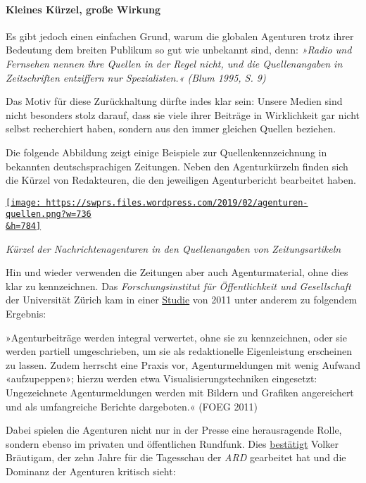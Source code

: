 \hypertarget{kleines-kuxfcrzel-grouxdfe-wirkung}{%
\paragraph{Kleines Kürzel, große
Wirkung}\label{kleines-kuxfcrzel-grouxdfe-wirkung}}

Es gibt jedoch einen einfachen Grund, warum die globalen Agenturen trotz
ihrer Bedeutung dem brei­ten Publikum so gut wie unbekannt sind, denn:
\emph{»Radio und Fernsehen nennen ihre Quellen in der Regel nicht, und
die Quellenangaben in Zeitschriften entziffern nur Spezialisten.« (Blum
1995, S. 9)}

Das Motiv für diese Zurückhaltung dürfte indes klar sein: Unsere Medien
sind nicht besonders stolz darauf, dass sie viele ihrer Beiträge in
Wirklichkeit gar nicht selbst recherchiert haben, sondern aus den immer
gleichen Quellen beziehen.

Die folgende Abbildung zeigt einige Beispiele zur
Quellen­kenn­zeich­nung in bekannten deutsch­sprachigen Zeitungen. Neben
den Agentur­kürzeln finden sich die Kürzel von Redakteuren, die den
jeweiligen Agenturbericht bearbeitet haben.

\href{https://swprs.files.wordpress.com/2019/02/agenturen-quellen.png}{\texttt{[image: https://swprs.files.wordpress.com/2019/02/agenturen-quellen.png?w=736\\\&h=784]}}

\emph{Kürzel der Nachrichtenagenturen in den Quellenangaben von
Zeitungsartikeln}

Hin und wieder verwenden die Zeitungen aber auch Agenturmaterial, ohne
dies klar zu kennzeichnen. Das \emph{Forschungsinstitut für
Öffentlichkeit und Gesellschaft} der Universität Zürich kam in einer
\href{http://www.foeg.uzh.ch/de/jahrbuch.html}{Studie} von 2011 unter
anderem zu folgendem Ergebnis:

»Agenturbeiträge werden integral verwertet, ohne sie zu kennzeichnen,
oder sie werden partiell umgeschrieben, um sie als redaktionelle
Eigenleistung erscheinen zu lassen. Zudem herrscht eine Praxis vor,
Agentur­meldungen mit wenig Aufwand «aufzupeppen»; hierzu werden etwa
Visualisierungstechniken eingesetzt: Ungezeichnete Agentur­meldungen
werden mit Bildern und Grafiken angereichert und als umfangreiche
Berichte dargeboten.« (FOEG 2011)

Dabei spielen die Agenturen nicht nur in der Presse eine heraus­ragende
Rolle, sondern ebenso im privaten und öffentlichen Rundfunk. Dies
\href{http://www.heise.de/tp/artikel/47/47821/3.html}{bestätigt} Volker
Bräutigam, der zehn Jahre für die Tagesschau der \emph{ARD} gearbeitet
hat und die Dominanz der Agenturen kritisch sieht:

